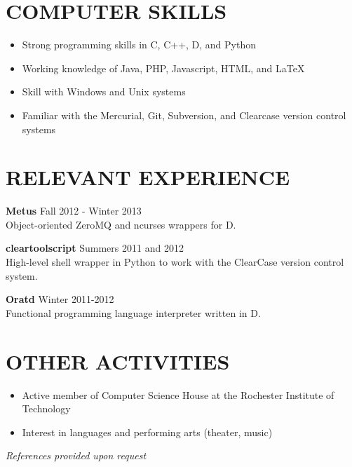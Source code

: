 \documentclass[line]{res}
\begin{document}
\begin{resume}
\section{COMPUTER SKILLS}
	\begin{itemize}[leftmargin=10pt]
	\item Strong programming skills in C, C++, D, and Python
	\item Working knowledge of Java, PHP, Javascript, HTML, and LaTeX
	\item Skill with Windows and Unix systems
	\item Familiar with the Mercurial, Git, Subversion, and Clearcase version control systems
	\end{itemize}

\section{RELEVANT EXPERIENCE}
	\textbf{Metus}
	\hfill
	Fall 2012 - Winter 2013
	\\
	Object-oriented ZeroMQ and ncurses wrappers for D.
	
	\textbf{cleartoolscript}
	\hfill
	Summers 2011 and 2012
	\\
	High-level shell wrapper in Python to work with the ClearCase version control system.
	
	\textbf{Oratd}
	\hfill
	Winter 2011-2012
	\\
	Functional programming language interpreter written in D.

\section{OTHER ACTIVITIES}
	\begin{itemize}[leftmargin=10pt]
	\item Active member of Computer Science House at the Rochester Institute of Technology
	\item Interest in languages and performing arts (theater, music)
	\end{itemize}

\begin{center}
\vspace{-0.26in}\hspace{-0.8in}\emph{References provided upon request\\[8pt]}
\end{center}

\end{resume}
\end{document}
